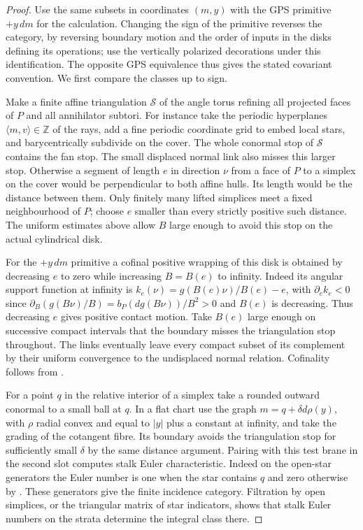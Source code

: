 \begin{proof}
Use the same subsets in coordinates $(m,y)$ with the GPS primitive $+y\,dm$ for the calculation. Changing the sign of the primitive reverses the category, by reversing boundary motion and the order of inputs in the disks defining its operations; use the vertically polarized decorations under this identification. The opposite GPS equivalence thus gives the stated covariant convention. We first compare the classes up to sign.

Make a finite affine triangulation $\mathcal S$ of the angle torus refining all projected faces of $P$ and all annihilator subtori. For instance take the periodic hyperplanes $\langle m,v\rangle\in\mathbb Z$ of the rays, add a fine periodic coordinate grid to embed local stars, and barycentrically subdivide on the cover. The whole conormal stop of $\mathcal S$ contains the fan stop. The small displaced normal link also misses this larger stop. Otherwise a segment of length $e$ in direction $\nu$ from a face of $P$ to a simplex on the cover would be perpendicular to both affine hulls. Its length would be the distance between them. Only finitely many lifted simplices meet a fixed neighbourhood of $P$; choose $e$ smaller than every strictly positive such distance. The uniform estimates above allow $B$ large enough to avoid this stop on the actual cylindrical disk.

For the $+y\,dm$ primitive a cofinal positive wrapping of this disk is obtained by decreasing $e$ to zero while increasing $B=B(e)$ to infinity. Indeed its angular support function at infinity is $k_e(\nu)=g(B(e)\nu)/B(e)-e$, with $\partial_e k_e<0$ since $\partial_B(g(B\nu)/B)=b_P(dg(B\nu))/B^2>0$ and $B(e)$ is decreasing. Thus decreasing $e$ gives positive contact motion. Take $B(e)$ large enough on successive compact intervals that the boundary misses the triangulation stop throughout. The links eventually leave every compact subset of its complement by their uniform convergence to the undisplaced normal relation. Cofinality follows from \cite[Lemma~5.1]{GPSmicro}.

For a point $q$ in the relative interior of a simplex take a rounded outward conormal to a small ball at $q$. In a flat chart use the graph $m=q+\delta d\rho(y)$, with $\rho$ radial convex and equal to $|y|$ plus a constant at infinity, and take the grading of the cotangent fibre. Its boundary avoids the triangulation stop for sufficiently small $\delta$ by the same distance argument. Pairing with this test brane in the second slot computes stalk Euler characteristic. Indeed on the open-star generators the Euler number is one when the star contains $q$ and zero otherwise by \cite[\S5.7, especially Lemma~5.21, and Theorem~5.34]{GPSmicro}. These generators give the finite incidence category. Filtration by open simplices, or the triangular matrix of star indicators, shows that stalk Euler numbers on the strata determine the integral class there.


\end{proof}
